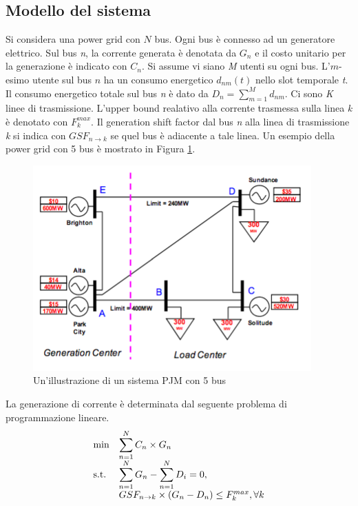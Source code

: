 \subsection{Modello del sistema}
Si considera una power grid con $N$ bus. Ogni bus è connesso ad un generatore elettrico. Sul bus \emph{n}, la corrente generata è denotata da \emph{$G_{n}$} e il costo unitario per la generazione è indicato con \emph{$C_{n}$}. Si assume vi siano \emph{M} utenti su ogni bus. L'$m$-esimo utente sul bus $n$ ha un consumo energetico $d_{nm}(t)$ nello slot temporale \emph{t}. Il consumo energetico totale sul bus \emph{n} è dato da $D_{n} = \sum_{m=1}^{M}d_{nm}$. Ci sono \emph{K} linee di trasmissione. L'upper bound realativo alla corrente trasmessa sulla linea \emph{k} è denotato con $F_{k}^{max}$. Il generation shift factor dal bus \emph{n} alla linea di trasmissione \emph{k} si indica con $GSF_{n \rightarrow k}$ se quel bus è adiacente a tale linea. Un esempio della power grid con 5 bus è mostrato in Figura \ref{fig:pjm}.
\begin{figure}[h]
	\centering
	\includegraphics[scale=0.400]{imgs/attack/pjm.png}
	\caption{Un'illustrazione di un sistema PJM con 5 bus} \label{fig:pjm}
\end{figure}
\newpage
La generazione di corrente è determinata dal seguente problema di programmazione lineare\cite{jam}.
\begin{equation*}
\begin{array}{ll@{}ll}
\text{min}  & \displaystyle\sum\limits_{n=1}^{N} C_{n} \times G_{n} &\\
\text{s.t.}& \displaystyle\sum\limits_{n=1}^{N} G_{n} -  \sum\limits_{n=1}^{N} D_{i} = 0,&\\
               & GSF_{n \rightarrow k} \times (G_{n} - D_{n}) \leq F_{k}^{max},\forall k&\\
\end{array}
\end{equation*}
